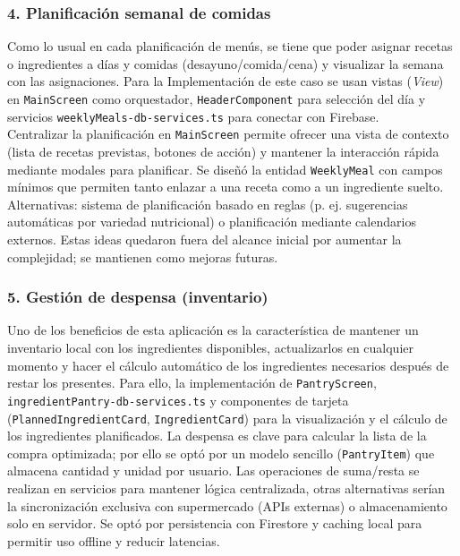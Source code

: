 \documentclass[twoside, openright, 11pt]{report}
\begin{document}
		\subsubsection{4. Planificación semanal de comidas}
		Como lo usual en cada planificación de menús, se tiene que poder asignar recetas o ingredientes a días y comidas (desayuno/comida/cena) y visualizar la semana con las asignaciones.  
		Para la Implementación de este caso se usan vistas (\textit{View}) en \texttt{MainScreen} como orquestador, \texttt{HeaderComponent} para selección del día y servicios \texttt{weeklyMeals-db-services.ts} para conectar con Firebase.\\
		Centralizar la planificación en \texttt{MainScreen} permite ofrecer una vista de contexto (lista de recetas previstas, botones de acción) y mantener la interacción rápida mediante modales para planificar. Se diseñó la entidad \texttt{WeeklyMeal} con campos mínimos que permiten tanto enlazar a una receta como a un ingrediente suelto.  
		Alternativas: sistema de planificación basado en reglas (p. ej. sugerencias automáticas por variedad nutricional) o planificación mediante calendarios externos. Estas ideas quedaron fuera del alcance inicial por aumentar la complejidad; se mantienen como mejoras futuras.
		
		\subsubsection{5. Gestión de despensa (inventario)}
		Uno de los beneficios de esta aplicación es la característica de mantener un inventario local con los ingredientes disponibles, actualizarlos en cualquier momento y hacer el cálculo automático de los ingredientes necesarios después de restar los presentes.
		Para ello, la implementación de \texttt{PantryScreen}, \texttt{ingredientPantry-db-services.ts} y componentes de tarjeta (\texttt{PlannedIngredientCard}, \texttt{IngredientCard}) para la visualización y el cálculo de los ingredientes planificados.  
		La despensa es clave para calcular la lista de la compra optimizada; por ello se optó por un modelo sencillo (\texttt{PantryItem}) que almacena cantidad y unidad por usuario. Las operaciones de suma/resta se realizan en servicios para mantener lógica centralizada, otras alternativas serían la sincronización exclusiva con supermercado (APIs externas) o almacenamiento solo en servidor. Se optó por persistencia con Firestore y caching local para permitir uso offline y reducir latencias.
		
\end{document}
